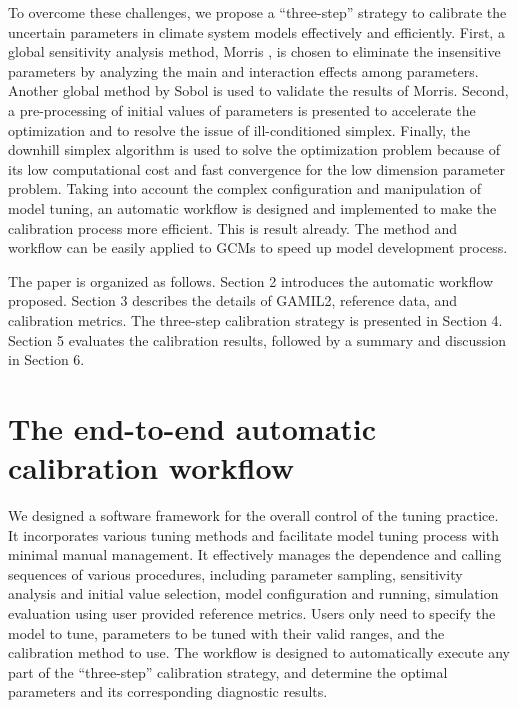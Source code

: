 \documentclass[gmd, manuscript]{copernicus}
\begin{document}
To overcome these challenges, we propose a ``three-step'' strategy to  calibrate the uncertain parameters in climate system models effectively and efficiently. First, a global sensitivity analysis method, Morris \citep{morris1991factorial, campolongo2007effective}, is chosen to eliminate the insensitive parameters by analyzing the main and interaction effects among parameters. Another global method by Sobol \citep{sobol2001global} is used to validate the results of Morris. Second, a pre-processing of initial values of parameters is presented to accelerate the optimization and to resolve the issue of ill-conditioned simplex. Finally, the downhill simplex algorithm is used to solve the optimization problem because of its low computational cost and fast convergence for the low dimension parameter problem. Taking into account the complex configuration and manipulation of model tuning, an automatic workflow is designed and implemented to make the calibration process more efficient. This is result already. The method and workflow can be easily applied to GCMs to speed up model development process.


The paper is organized as follows. Section 2 introduces the automatic workflow proposed. Section 3 describes the details of GAMIL2, reference data, and calibration metrics. The three-step calibration strategy is presented in Section 4. Section 5 evaluates the calibration results, followed by a summary and discussion in Section 6.


\section{The end-to-end automatic calibration workflow}

We designed a software framework for the overall control of the tuning practice. It incorporates various tuning methods and facilitate model tuning process with minimal manual management. It effectively manages the dependence and calling sequences of various procedures, including parameter sampling, sensitivity analysis and initial value selection, model configuration and running, simulation evaluation using user provided reference metrics. Users only need to specify the model to tune, parameters to be tuned with their valid ranges, and the calibration method to use. The workflow is designed to automatically execute any part of the ``three-step'' calibration strategy, and determine the optimal parameters and its corresponding diagnostic results. 
\end{document}
